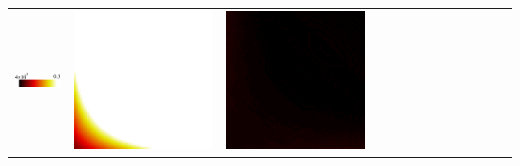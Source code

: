 \begin{landscape}
\begin{table}[b]
\begin{tabular}{ccccccccccccc}
\hline
 \includegraphics[scale=0.30]{chapter5/figures/legend-table.png} &
 \includegraphics[scale=0.04]{chapter5/figures/wrong_opacity_accumulation-diff-2.png} &
 \includegraphics[scale=0.04]{chapter5/figures/wrong_ray_increment-diff-2.png}        &

\end{tabular}
\end{table}
\end{landscape}
